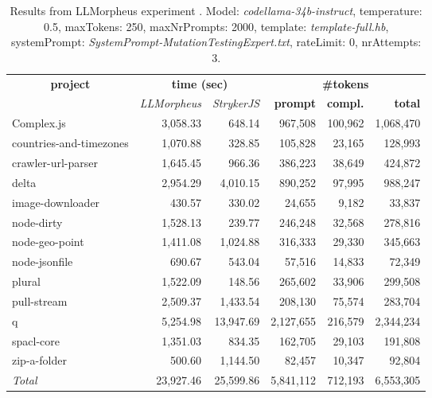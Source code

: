 
\begin{table*}[hbt!]
\centering
{\scriptsize
\begin{tabular}{l||r|r|r|r|r}
\multicolumn{1}{c|}{\bf project} & \multicolumn{2}{|c|}{\bf time (sec)} & \multicolumn{3}{|c|}{\bf \#tokens} \\
               & {\it LLMorpheus} & {\it StrykerJS} & {\bf prompt} & {\bf compl.} & {\bf total} \\
\hline
  Complex.js & 3,058.33 & 648.14 & 967,508 & 100,962 & 1,068,470 \\ 
countries-and-timezones & 1,070.88 & 328.85 & 105,828 & 23,165 & 128,993 \\ 
crawler-url-parser & 1,645.45 & 966.36 & 386,223 & 38,649 & 424,872 \\ 
delta & 2,954.29 & 4,010.15 & 890,252 & 97,995 & 988,247 \\ 
image-downloader & 430.57 & 330.02 & 24,655 & 9,182 & 33,837 \\ 
node-dirty & 1,528.13 & 239.77 & 246,248 & 32,568 & 278,816 \\ 
node-geo-point & 1,411.08 & 1,024.88 & 316,333 & 29,330 & 345,663 \\ 
node-jsonfile & 690.67 & 543.04 & 57,516 & 14,833 & 72,349 \\ 
plural & 1,522.09 & 148.56 & 265,602 & 33,906 & 299,508 \\ 
pull-stream & 2,509.37 & 1,433.54 & 208,130 & 75,574 & 283,704 \\ 
q & 5,254.98 & 13,947.69 & 2,127,655 & 216,579 & 2,344,234 \\ 
spacl-core & 1,351.03 & 834.35 & 162,705 & 29,103 & 191,808 \\ 
zip-a-folder & 500.60 & 1,144.50 & 82,457 & 10,347 & 92,804 \\ 
\hline
  \textit{Total} & 23,927.46 & 25,599.86 & 5,841,112 & 712,193 & 6,553,305 \\
  \end{tabular}
  }
  \\[2mm]
  \caption{Results from LLMorpheus experiment .
    Model: \textit{codellama-34b-instruct}, 
    temperature: 0.5, 
    maxTokens: 250, 
    maxNrPrompts: 2000, 
    template: \textit{template-full.hb}, 
    systemPrompt: \textit{SystemPrompt-MutationTestingExpert.txt}, 
    rateLimit: 0, 
    nrAttempts: 3.  
  }
  \label{table:Cost:run322:codellama-34b-instruct:template-full.hb:0.5}
\end{table*}